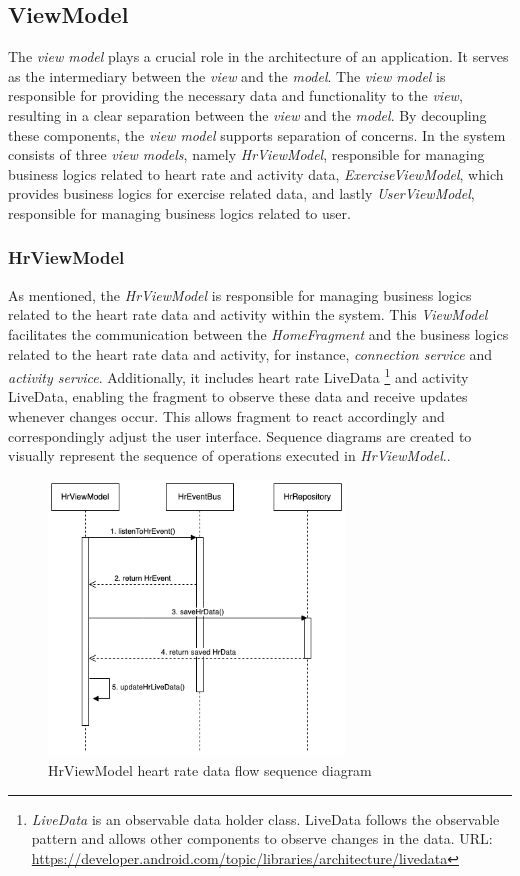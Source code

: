 \subsection{ViewModel}
\label{chap:viewmodel_design}
The \emph{view model} plays a crucial role in the architecture of an application. It serves as the intermediary between the \emph{view} and the \emph{model}.
The \emph{view model} is responsible for providing the necessary data and functionality to the \emph{view}, resulting in a clear separation between the \emph{view} and the \emph{model}.
By decoupling these components, the \emph{view model} supports separation of concerns.
In the system consists of three \emph{view models}, namely \emph{HrViewModel}, responsible for managing business logics related to heart rate and activity data, \emph{ExerciseViewModel}, which provides business logics for exercise related data, and lastly \emph{UserViewModel}, responsible for managing business logics related to user.

\subsubsection{HrViewModel}
As mentioned, the \emph{HrViewModel} is responsible for managing business logics related to the heart rate data and activity within the system.
This \emph{ViewModel} facilitates the communication between the \emph{HomeFragment} and the business logics related to the heart rate data and activity, for instance, \emph{connection service} and \emph{activity service}.
Additionally, it includes heart rate LiveData \footnote{\emph{LiveData} is an observable data holder class. LiveData follows the observable pattern and allows other components to observe changes in the data. URL: \url{https://developer.android.com/topic/libraries/architecture/livedata}} and activity LiveData, enabling the fragment to observe these data and receive updates whenever changes occur. This allows fragment to react accordingly and correspondingly adjust the user interface.
Sequence diagrams are created to visually represent the sequence of operations executed in \emph{HrViewModel}..

\begin{figure}[H]
    \centering
    \includegraphics[width=0.7\textwidth]{diagrams/hrviewmodel-hr.drawio.png}
    \caption{HrViewModel heart rate data flow sequence diagram}
    \label{fig:hrviewmodel_hrdata}
\end{figure}

